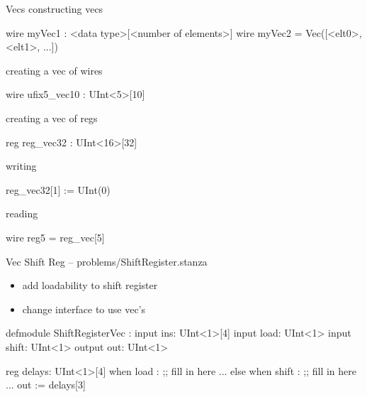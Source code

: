 \documentclass[xcolor=pdflatex,dvipsnames,table]{beamer}
\begin{document}
\begin{frame}[fragile]{Vecs}
constructing vecs
\begin{stanza}
wire myVec1 : <data type>[<number of elements>]
wire myVec2 = Vec([<elt0>, <elt1>, ...])
\end{stanza}

creating a vec of wires
\begin{stanza}
wire ufix5_vec10 : UInt<5>[10]
\end{stanza}


creating a vec of regs
\begin{stanza}
reg reg_vec32 : UInt<16>[32]
\end{stanza}

writing
\begin{stanza}
reg_vec32[1] := UInt(0)
\end{stanza}

reading
\begin{stanza}
wire reg5 = reg_vec[5]
\end{stanza}

\end{frame}

\begin{frame}[fragile]{Vec Shift Reg -- {\tiny problems/ShiftRegister.stanza}}

\begin{itemize}
\item add loadability to shift register
\item change interface to use vec's
\end{itemize}

{
\begin{stanza}
defmodule ShiftRegisterVec :
  input ins: UInt<1>[4]
  input load: UInt<1>
  input shift: UInt<1>
  output out: UInt<1>

  reg delays: UInt<1>[4]
  when load :
    ;; fill in here ...
  else when shift :
    ;; fill in here ...
  out := delays[3]    
\end{stanza}
}

\end{frame}

\end{document}
